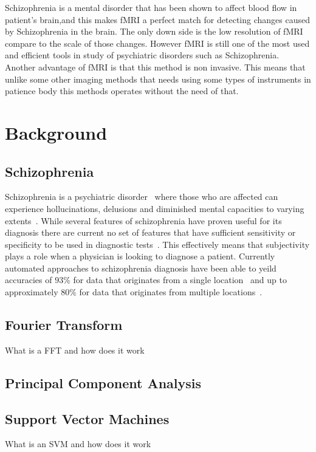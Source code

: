 \documentclass{article} %
\begin{document}
Schizophrenia is a mental disorder that has been shown to affect blood flow in patient's brain\cite{Kenji_2010},and this makes fMRI a perfect match for detecting changes caused by Schizophrenia in the brain. The only down side is the low resolution of fMRI compare to the scale of those changes. However fMRI is still one of the most used and efficient tools in study of psychiatric disorders such as Schizophrenia.   \\
Another advantage of fMRI is that this method is non invasive. This means that unlike some other imaging methods that needs using some types of instruments in patience body this methods operates without the need of that. 


\section{Background}

\subsection{Schizophrenia}
Schizophrenia is a psychiatric disorder~\cite{Rish_2013} where those who are 
affected can experience hollucinations, delusions and diminished mental 
capacities to varying extents~\cite{jablensky2010diagnostic}. While several
features of schizophrenia have proven useful for its diagnosis there are
current no set of features that have sufficient sensitivity or specificity
to be used in diagnostic tests~\cite{jablensky2010diagnostic}. This 
effectively means that subjectivity plays a role when a physician is
looking to diagnose a patient. Currently automated approaches to schizophrenia
diagnosis have  been able to yeild accuracies of $93\%$ for data that 
originates from a single location~\cite{Rish_2013} and up to approximately 
$80\%$ for data that originates from multiple locations~\cite{Cheng2015}.

\subsection{Fourier Transform}
What is a FFT and how does it work

\subsection{Principal Component Analysis}

\subsection{Support Vector Machines}
What is an SVM and how does it work
\end{document}
